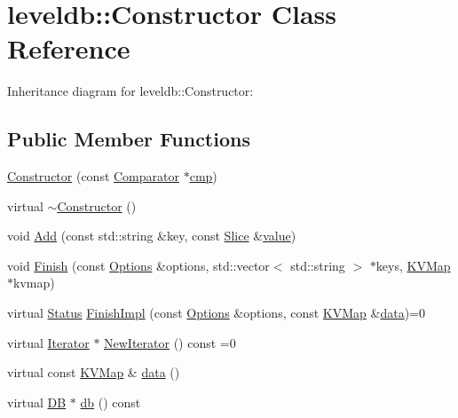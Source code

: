 \hypertarget{classleveldb_1_1_constructor}{\section{leveldb\-:\-:Constructor Class Reference}
\label{classleveldb_1_1_constructor}
}


Inheritance diagram for leveldb\-:\-:Constructor\-:
\subsection*{Public Member Functions}
\begin{DoxyCompactItemize}
\item 
\hyperlink{classleveldb_1_1_constructor_a5f4d21512e279769e881b2ae85129f08}{Constructor} (const \hyperlink{structleveldb_1_1_comparator}{Comparator} $\ast$\hyperlink{table__test_8cc_a87863e435922f0910ca8db43f02a6c0b}{cmp})
\item 
virtual \hyperlink{classleveldb_1_1_constructor_a643f9e1fc58b988f41b2a081398b04a1}{$\sim$\-Constructor} ()
\item 
void \hyperlink{classleveldb_1_1_constructor_a5bb35f87d196065b8357200922aae69f}{Add} (const std\-::string \&key, const \hyperlink{classleveldb_1_1_slice}{Slice} \&\hyperlink{cache_8cc_a0f61d63b009d0880a89c843bd50d8d76}{value})
\item 
void \hyperlink{classleveldb_1_1_constructor_a5c7f63378f8834cac3be93040e0e49fc}{Finish} (const \hyperlink{structleveldb_1_1_options}{Options} \&options, std\-::vector$<$ std\-::string $>$ $\ast$keys, \hyperlink{namespaceleveldb_aac1e50450147be263e08252c6700f7a7}{K\-V\-Map} $\ast$kvmap)
\item 
virtual \hyperlink{classleveldb_1_1_status}{Status} \hyperlink{classleveldb_1_1_constructor_a0f11e251cfbe990b5b0a4e7040923189}{Finish\-Impl} (const \hyperlink{structleveldb_1_1_options}{Options} \&options, const \hyperlink{namespaceleveldb_aac1e50450147be263e08252c6700f7a7}{K\-V\-Map} \&\hyperlink{classleveldb_1_1_constructor_a55a0363200d6e86d8beb3b15b75e3824}{data})=0
\item 
virtual \hyperlink{classleveldb_1_1_iterator}{Iterator} $\ast$ \hyperlink{classleveldb_1_1_constructor_a362b24b7194f605b655f5a136e0ae43c}{New\-Iterator} () const =0
\item 
virtual const \hyperlink{namespaceleveldb_aac1e50450147be263e08252c6700f7a7}{K\-V\-Map} \& \hyperlink{classleveldb_1_1_constructor_a55a0363200d6e86d8beb3b15b75e3824}{data} ()
\item 
virtual \hyperlink{classleveldb_1_1_d_b}{D\-B} $\ast$ \hyperlink{classleveldb_1_1_constructor_a207d6002cdb7ead23cecf6cfb4350a80}{db} () const 
\end{DoxyCompactItemize}

